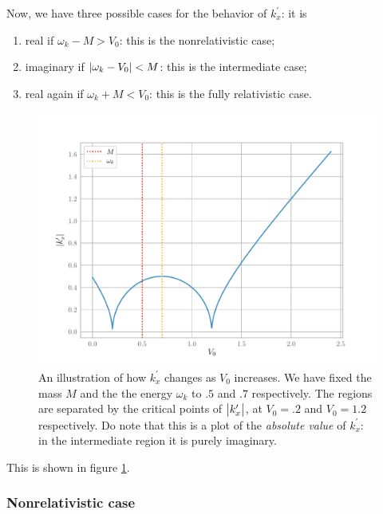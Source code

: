 \documentclass[main.tex]{subfiles}
\begin{document}
Now, we have three possible cases for the behavior of \(k_x^{\prime }\): it is 
\begin{enumerate}
  \item real if \(\omega_{k} - M > V_0 \): this is the nonrelativistic case;
  \item imaginary if \(\abs{\omega_{k} - V_0 } < M\): this is the intermediate case;
  \item real again if \(\omega_{k} + M < V_0 \): this is the fully relativistic case.
\end{enumerate}

\begin{figure}[ht]
\centering
\includegraphics[width=\textwidth]{figures/primed_momentum_potential.pdf}
\caption{An illustration of how \(k_x^{\prime }\) changes as \(V_0 \) increases. We have fixed the mass \(M\) and the the energy \(\omega_{k}\) to \(\num{.5}\) and \(\num{.7}\) respectively. The regions are separated by the critical points of \(\abs{k_x'}\), at \(V_0 = \num{.2}\) and \(V_0 = \num{1.2}\) respectively. Do note that this is a plot of the \emph{absolute value} of \(k_x^{\prime }\): in the intermediate region it is purely imaginary.}
\label{fig:primed_momentum_potential}
\end{figure}

This is shown in figure \ref{fig:primed_momentum_potential}.
 

\subsubsection{Nonrelativistic case}
\end{document}

